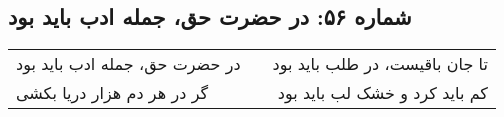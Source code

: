 \begin{center}
\section*{شماره ۵۶: در حضرت حق، جمله ادب باید بود}
\label{sec:056}
\begin{longtable}{l p{0.5cm} r}
در حضرت حق، جمله ادب باید بود
&&
تا جان باقیست، در طلب باید بود
\\
گر در هر دم هزار دریا بکشی
&&
کم باید کرد و خشک لب باید بود
\\
\end{longtable}
\end{center}
